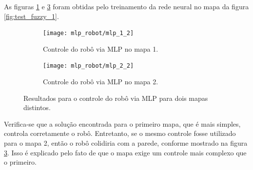 	As figuras \ref{fig:mlp_2_1} e \ref{fig:mlp_2_2} foram obtidas pelo
	treinamento da rede neural no mapa da figura \ref{fig:test_fuzzy_1}.  
	
	\FloatBarrier
			    
	\begin{figure}[h!]
	
	\centering
	
		\begin{subfigure}{.5\textwidth}
		  \centering
		  \texttt{[image: mlp\_robot/mlp\_1\_2]}
		  \caption{\centering Controle do robô via MLP no mapa 1.}
		  \label{fig:mlp_2_1}
		  
		\end{subfigure}%
		\begin{subfigure}{.5\textwidth}
		  \centering
		  \texttt{[image: mlp\_robot/mlp\_2\_2]}
		  \caption{\centering Controle do robô via MLP no mapa 2.}
		  \label{fig:mlp_2_2} 
		\end{subfigure}
	
	
	\caption{Resultados para o controle do robô via MLP
	para dois mapas distintos.}
	\end{figure} 
	
	\FloatBarrier
	
Verifica-se que a solução encontrada para o primeiro mapa, que é mais simples,
controla corretamente o robô. Entretanto, se o mesmo controle fosse utilizado
para o mapa 2, então o robô colidiria com a parede, conforme mostrado na figura
\ref{fig:mlp_2_2}. Isso é explicado pelo fato de que o mapa exige um controle
mais complexo que o primeiro.
